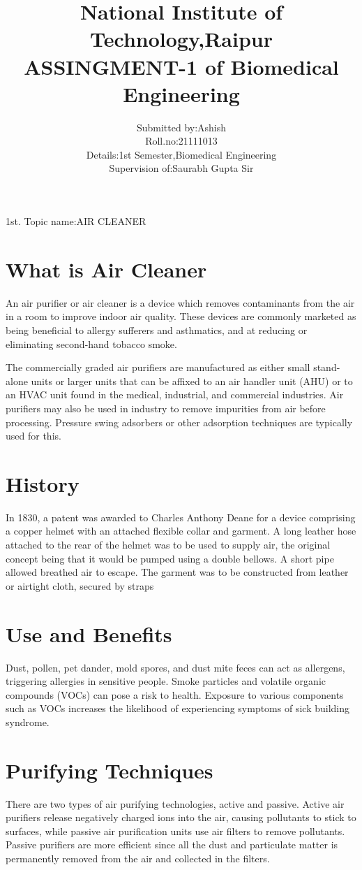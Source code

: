 \documentclass[12pt]{article}
\title{National Institute of Technology,Raipur\\ASSINGMENT-1 of Biomedical Engineering}
\author{Submitted by:Ashish\\Roll.no:21111013\\Details:1st Semester,Biomedical Engineering\\Supervision of:Saurabh Gupta Sir}
\begin{document}
\maketitle
\clearpage
1st. Topic name:AIR CLEANER


\section{What is Air Cleaner}
An air purifier or air cleaner is a device which removes contaminants from the air in a room to improve indoor air quality. These devices are commonly marketed as being beneficial to allergy sufferers and asthmatics, and at reducing or eliminating second-hand tobacco smoke.

The commercially graded air purifiers are manufactured as either small stand-alone units or larger units that can be affixed to an air handler unit (AHU) or to an HVAC unit found in the medical, industrial, and commercial industries. Air purifiers may also be used in industry to remove impurities from air before processing. Pressure swing adsorbers or other adsorption techniques are typically used for this.

\section*{History}
In 1830, a patent was awarded to Charles Anthony Deane for a device comprising a copper helmet with an attached flexible collar and garment. A long leather hose attached to the rear of the helmet was to be used to supply air, the original concept being that it would be pumped using a double bellows. A short pipe allowed breathed air to escape. The garment was to be constructed from leather or airtight cloth, secured by straps

\section{Use and Benefits}
Dust, pollen, pet dander, mold spores, and dust mite feces can act as allergens, triggering allergies in sensitive people. Smoke particles and volatile organic compounds (VOCs) can pose a risk to health. Exposure to various components such as VOCs increases the likelihood of experiencing symptoms of sick building syndrome.

\section{Purifying Techniques}
There are two types of air purifying technologies, active and passive. Active air purifiers release negatively charged ions into the air, causing pollutants to stick to surfaces, while passive air purification units use air filters to remove pollutants. Passive purifiers are more efficient since all the dust and particulate matter is permanently removed from the air and collected in the filters.
\end{document}

